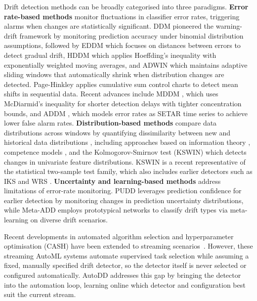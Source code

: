 \documentclass[conference]{IEEEtran}
\begin{document}
Drift detection methods can be broadly categorised into three paradigms. \textbf{Error rate-based methods} monitor fluctuations in classifier error rates, triggering alarms when changes are statistically significant. DDM \cite{Gama2004DDM} pioneered the warning-drift framework by monitoring prediction accuracy under binomial distribution assumptions, followed by EDDM \cite{BaenaGarcia2006EDDM} which focuses on distances between errors to detect gradual drift, HDDM \cite{FriasBlanco2015Hoeffding} which applies Hoeffding's inequality with exponentially weighted moving averages, and ADWIN \cite{Bifet2007ADWIN} which maintains adaptive sliding windows that automatically shrink when distribution changes are detected. Page-Hinkley \cite{Page1954Continuous} applies cumulative sum control charts to detect mean shifts in sequential data. Recent advances include MDDM \cite{Pesaranghader2017MDDM}, which uses McDiarmid's inequality for shorter detection delays with tighter concentration bounds, and ADDM \cite{Mayaki2022ADDM}, which models error rates as SETAR time series \cite{Tsay1989TestingAM} to achieve lower false alarm rates. \textbf{Distribution-based methods} compare data distributions across windows by quantifying dissimilarity between new and historical data distributions \cite{Kifer2004ChangeDetection}, including approaches based on information theory \cite{Dasu2006InformationTheoretic}, competence models \cite{Lu2014CompetenceModels}, and the Kolmogorov-Smirnov test (KSWIN) \cite{Raab2020KSWIN} which detects changes in univariate feature distributions. KSWIN is a recent representative of the statistical two-sample test family, which also includes earlier detectors such as IKS \cite{dosReis2016IKS} and WRS \cite{Barros2018}. \textbf{Uncertainty and learning-based methods} address limitations of error-rate monitoring. PUDD \cite{Lu2025PUDD} leverages prediction confidence for earlier detection by monitoring changes in prediction uncertainty distributions, while Meta-ADD \cite{Yu2021MetaADD} employs prototypical networks to classify drift types via meta-learning on diverse drift scenarios.

Recent developments in automated algorithm selection and hyperparameter optimisation (CASH) \cite{Hutter2019AutoML} have been extended to streaming scenarios~\cite{kulbach2022evolution}. However, these streaming AutoML systems automate supervised task selection while assuming a fixed, manually specified drift detector, so the detector itself is never selected or configured automatically. AutoDD addresses this gap by bringing the detector into the automation loop, learning online which detector and configuration best suit the current stream.
\end{document}
